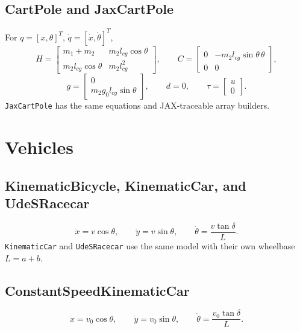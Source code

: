 \documentclass[11pt]{article}
\begin{document}
\subsection{CartPole and JaxCartPole}
For \(q=[x,\theta]^T\), \(\dot q=[\dot x,\dot\theta]^T\),
\begin{equation}
    H =
    \begin{bmatrix}
        m_1+m_2 & m_2l_{cg}\cos\theta \\
        m_2l_{cg}\cos\theta & m_2l_{cg}^2
    \end{bmatrix},
    \qquad
    C =
    \begin{bmatrix}
        0 & -m_2l_{cg}\sin\theta\,\dot\theta \\
        0 & 0
    \end{bmatrix},
\end{equation}
\begin{equation}
    g =
    \begin{bmatrix}
        0\\m_2g_0l_{cg}\sin\theta
    \end{bmatrix},
    \qquad
    d=0,
    \qquad
    \tau=\begin{bmatrix}u\\0\end{bmatrix}.
\end{equation}
\texttt{JaxCartPole} has the same equations and JAX-traceable array builders.

\section{Vehicles}

\subsection{KinematicBicycle, KinematicCar, and UdeSRacecar}
\begin{equation}
    \dot x = v\cos\theta,
    \qquad
    \dot y = v\sin\theta,
    \qquad
    \dot\theta = \frac{v\tan\delta}{L}.
\end{equation}
\texttt{KinematicCar} and \texttt{UdeSRacecar} use the same model with their
own wheelbase \(L=a+b\).

\subsection{ConstantSpeedKinematicCar}
\begin{equation}
    \dot x = v_0\cos\theta,
    \qquad
    \dot y = v_0\sin\theta,
    \qquad
    \dot\theta = \frac{v_0\tan\delta}{L}.
\end{equation}
\end{document}

